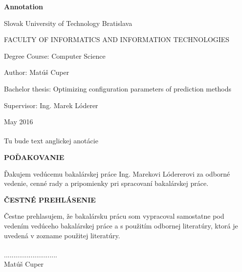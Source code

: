 \documentclass[a4paper,slovak,12pt,appendix]{article}
\begin{document}
\newpage
\thispagestyle{plain}
\vspace*{1.5cm}
\begin{center}
  \begin{Large}
    \textbf{Annotation} \par
  \end{Large}
\end{center}
{Slovak University of Technology Bratislava \par}
{FACULTY OF INFORMATICS AND INFORMATION TECHNOLOGIES \par}
{Degree Course: Computer Science \par}
{Author: Matúš Cuper \par}
{Bachelor thesis: Optimizing configuration parameters of prediction methods \par}
{Supervisor: Ing. Marek Lóderer \par}
{May 2016 \\} \\
Tu bude text anglickej anotácie


\newpage
\thispagestyle{plain}
\vspace*{15cm}
\begin{large}
  \noindent \textbf{POĎAKOVANIE} \par
\end{large}
\vspace*{0.5cm}
\noindent
Ďakujem vedúcemu bakalárskej práce Ing. Marekovi Lódererovi za odborné vedenie,
cenné rady a pripomienky pri spracovaní bakalárskej práce.

\newpage
\thispagestyle{plain}
\vspace*{15cm}
\begin{large}
  \noindent \textbf{ČESTNÉ PREHLÁSENIE} \par
\end{large}
\vspace*{0.5cm}
\noindent
Čestne prehlasujem, že bakalársku prácu som vypracoval samostatne pod vedením
vedúceho bakalárskej práce a s použitím odbornej literatúry, ktorá je uvedená
v zozname použitej literatúry. \\
\vspace*{0.5cm}\\
\hspace*{10cm}............................\\
\hspace*{10.7cm} Matúš Cuper
\end{document}
